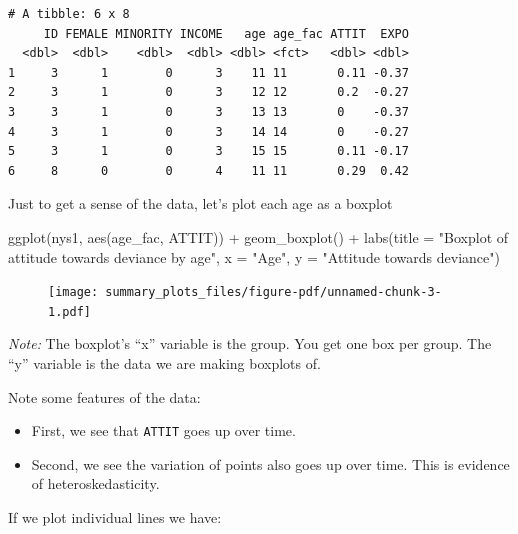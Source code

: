 \documentclass[
  letterpaper,
  DIV=11,
  numbers=noendperiod]{scrreprt}
\newenvironment{Shaded}{\begin{snugshade}}{\end{snugshade}}
\newcommand{\AttributeTok}[1]{\textcolor[rgb]{0.49,0.56,0.16}{#1}}
\newcommand{\FunctionTok}[1]{\textcolor[rgb]{0.02,0.16,0.49}{#1}}
\newcommand{\NormalTok}[1]{\textcolor[rgb]{0.00,0.44,0.13}{#1}}
\newcommand{\SpecialCharTok}[1]{\textcolor[rgb]{0.25,0.44,0.63}{#1}}
\newcommand{\StringTok}[1]{\textcolor[rgb]{0.25,0.44,0.63}{#1}}
\providecommand{\tightlist}{%
  \setlength{\itemsep}{0pt}\setlength{\parskip}{0pt}}\usepackage{longtable,booktabs,array}
\begin{document}
\begin{verbatim}
# A tibble: 6 x 8
     ID FEMALE MINORITY INCOME   age age_fac ATTIT  EXPO
  <dbl>  <dbl>    <dbl>  <dbl> <dbl> <fct>   <dbl> <dbl>
1     3      1        0      3    11 11       0.11 -0.37
2     3      1        0      3    12 12       0.2  -0.27
3     3      1        0      3    13 13       0    -0.37
4     3      1        0      3    14 14       0    -0.27
5     3      1        0      3    15 15       0.11 -0.17
6     8      0        0      4    11 11       0.29  0.42
\end{verbatim}

Just to get a sense of the data, let's plot each age as a boxplot

\begin{Shaded}
\begin{Highlighting}[]
  \FunctionTok{ggplot}\NormalTok{(nys1, }\FunctionTok{aes}\NormalTok{(age\_fac, ATTIT)) }\SpecialCharTok{+}
    \FunctionTok{geom\_boxplot}\NormalTok{() }\SpecialCharTok{+} 
    \FunctionTok{labs}\NormalTok{(}\AttributeTok{title =} \StringTok{"Boxplot of attitude towards deviance by age"}\NormalTok{, }
         \AttributeTok{x =} \StringTok{"Age"}\NormalTok{, }\AttributeTok{y =} \StringTok{"Attitude towards deviance"}\NormalTok{)}
\end{Highlighting}
\end{Shaded}

\begin{figure}[H]

{\centering \texttt{[image: summary\_plots\_files/figure-pdf/unnamed-chunk-3-1.pdf]}

}

\end{figure}

\emph{Note:} The boxplot's ``x'' variable is the group. You get one box
per group. The ``y'' variable is the data we are making boxplots of.

Note some features of the data:

\begin{itemize}
\tightlist
\item
  First, we see that \texttt{ATTIT} goes up over time.
\item
  Second, we see the variation of points also goes up over time. This is
  evidence of heteroskedasticity.
\end{itemize}

If we plot individual lines we have:
\end{document}
